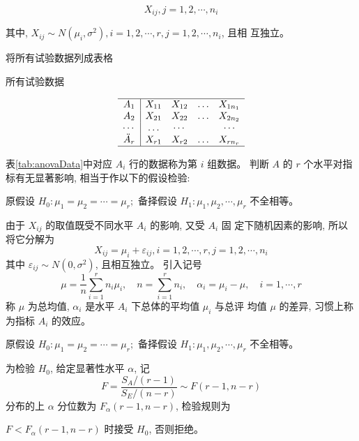 $$
X_{i j}, j=1,2, \cdots, n_{i}
$$

其中, $X_{i j} \sim N\left(\mu_{i}, \sigma^{2}\right), i=1,2, \cdots, r, j=1,2, \cdots, n_{i}$, 且相
互独立。 

将所有试验数据列成表格

\begin{table}
\caption{所有试验数据}
      \label{tab:anovaData}
$$\begin{array}{c|cccc}
    \hline A_{1} & X_{11} & X_{12} & \ldots & X_{1 n_{1}} \\
    A_{2} & X_{21} & X_{22} & \ldots & X_{2 n_{2}} \\
    \cdots & \ldots & \cdots & & \cdots \\
    \ddot{A}_{r} & X_{r 1} & X_{r 2} & \ldots & X_{r n_{r}} \\
    \hline
    \end{array}
$$  
\end{table}


表\cref{tab:anovaData}中对应 $A_{i}$ 行的数据称为第 $i$ 组数据。 判断 ${A}$ 的 ${r}$ 个水平对指标有无显著影响, 相当于作以下的假设检验:

原假设 $H_{0}: \mu_{1}=\mu_{2}=\cdots=\mu_{r} ;$
备择假设 ${H}_{1}: \mu_{1}, \mu_{2}, \cdots, \mu_{r}$ 不全相等。 

由于 \( X_{i j} \) 的取值既受不同水平 \( A_{i} \) 的影响, 又受 \( A_{i} \) 固 定下随机因素的影响, 所以将它分解为
$$
X_{i j}=\mu_{i}+\varepsilon_{i j}, i=1,2, \cdots, r, j=1,2, \cdots, n_{i}\label{eq:anovaDecomposition}
$$
其中 \( \varepsilon_{i j} \sim N\left({0}, \sigma^{2}\right) \), 且相互独立。 引入记号
$$
\mu=\frac{1}{n} \sum_{i=1}^{r} n_{i} \mu_{i}, \quad n=\sum_{i=1}^{r} n_{i}, \quad \alpha_{i}=\mu_{i}-\mu, \quad i=1, \cdots, r
$$
称 \( \mu \) 为总均值, \( \alpha_{i} \) 是水平 \( A_{i} \) 下总体的平均值 \( \mu_{i} \) 与总评
均值 \( \mu \) 的差异, 习惯上称为指标 \( {A}_{i} \) 的效应。 

\begin{definition}
原假设 $H_{0}: \mu_{1}=\mu_{2}=\cdots=\mu_{r} ;$
备择假设 ${H}_{1}: \mu_{1}, \mu_{2}, \cdots, \mu_{r}$ 不全相等。 

为检验 \( {H}_{0} \), 给定显著性水平 \( \alpha \), 记 \[ {F}=\frac{S_{A} /(r-1)}{S_{E} /(n-r)} \sim F(r-1, n-r) \] 分布的上 \( \alpha \) 分位数为 \( {F}_{\alpha}({r}-{1}, {n}-{r}) \), 检验规则为

\( {F}<{F}_{\alpha}({r}-{1}, {n}-{r}) \) 时接受 \( {H}_{{0}} \), 否则拒绝。 
\end{definition}

